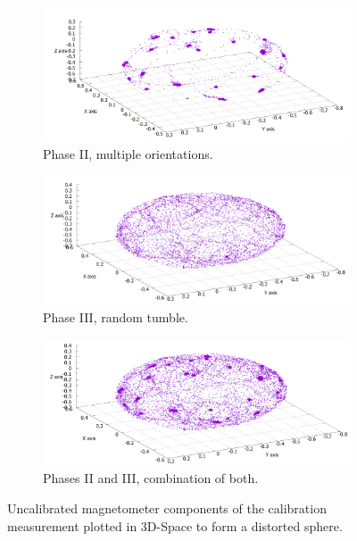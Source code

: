\begin{figure}[h]
\begin{subfigure}[t]{.33\textwidth}
  \centering
  \includegraphics[width=.8\linewidth]{images/04_calibration/raw_sphere_calibration_phase_II.png}
  \caption{Phase II, multiple orientations.}
  \label{fig:res:raw_calibration_three_phase_II}
\end{subfigure}%
\begin{subfigure}[t]{.33\textwidth}
  \centering
  \includegraphics[width=.8\linewidth]{images/04_calibration/raw_sphere_calibration_phase_III.png}
  \caption{Phase III, random tumble.}
  \label{fig:res:raw_calibration_three_phase_III}
\end{subfigure}
\begin{subfigure}[t]{.33\textwidth}
  \centering
  \includegraphics[width=.8\linewidth]{images/04_calibration/raw_sphere_calibration_phases_II_III.png}
  \caption{Phases II and III, combination of both.}
\end{subfigure}
\caption{Uncalibrated magnetometer components of the calibration measurement plotted in 3D-Space to form a distorted sphere.}
\label{fig:res:raw_calibration_three_phases}
\end{figure}


